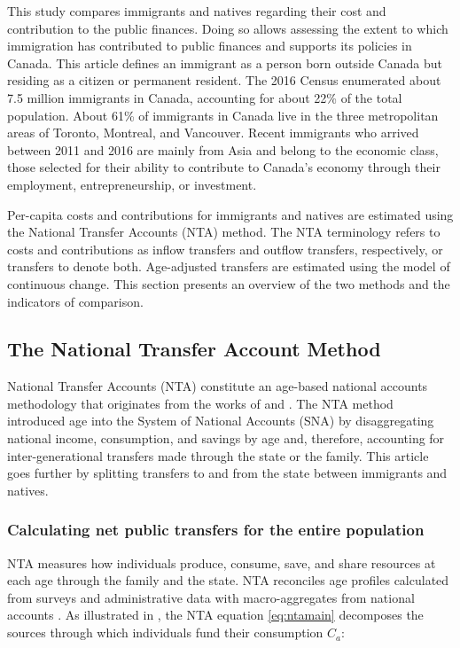 This study compares immigrants and natives regarding their cost and contribution to the public finances.
Doing so allows assessing the extent to which immigration has contributed to public finances and supports its policies in Canada.
This article defines an immigrant as a person born outside Canada but residing as a citizen or permanent resident.
The 2016 Census enumerated about 7.5 million immigrants in Canada, accounting for about 22\% of the total population.
About 61\% of immigrants in Canada live in the three metropolitan areas of Toronto, Montreal, and Vancouver.
Recent immigrants who arrived between 2011 and 2016 are mainly from Asia and belong to the economic class, those selected for their ability to contribute to Canada's economy through their employment, entrepreneurship, or investment.

\vspace{0.7em}\par
Per-capita costs and contributions for immigrants and natives are estimated using the National Transfer Accounts (NTA) method.
The NTA terminology refers to costs and contributions as inflow transfers and outflow transfers, respectively, or transfers to denote both.
Age-adjusted transfers are estimated using the model of continuous change.
This section presents an overview of the two methods and the indicators of comparison.

\subsection{The National Transfer Account Method}\label{sec:nta}
National Transfer Accounts (NTA) constitute an age-based national accounts methodology that originates from the works of \citet{leeAgeStructureIntergenerational1980} and \citet{Mason:1988fz}.
The NTA method introduced age into the System of National Accounts (SNA) by disaggregating national income, consumption, and savings by age and, therefore, accounting for inter-generational transfers made through the state or the family.
This article goes further by splitting transfers to and from the state between immigrants and natives.

\subsubsection*{Calculating net public transfers for the entire population}
NTA measures how individuals produce, consume, save, and share resources at each age through the family and the state.
NTA reconciles age profiles calculated from surveys and administrative data with macro-aggregates from national accounts \citep{UnitedNations:2013vz}.
As illustrated in \citet{dAlbis:2019de}, the NTA equation \autoref{eq:ntamain} decomposes the sources through which individuals fund their consumption \(C_a\):

